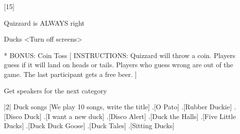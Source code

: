 \documentclass{pubQuiz}
\begin{document}
	[15] %
		\begin{PubRules}
			\item Quizzard is ALWAYS right
		\end{PubRules}
		\begin{PubCategory}{Ducks}	%
			<Turn off screens>	%
		\end{PubCategory}
		\begin{PubCategory}*		%
			{BONUS: Coin Toss}		%
			[	INSTRUCTIONS: Quizzard will throw a coin. 
				Players guess if it will land on heads or tails.
				Players who guess wrong are out of the game.
				The last participant gets a free beer.	] 
		\end{PubCategory}
		\begin{PubInstructions}
			\item Get speakers for the next category
		\end{PubInstructions}
		\begin{PubCategory}|2|		%
			{Duck songs} 	%
			[We play 10 songs, write the title]	%
			\PubQ[Track 1].[O Pato] %
			\PubQ[Track 2].[Rubber Duckie]
			\PubQ[Track 3].[Disco Duck]
			\PubQ[Track 4].[I want a new duck]
			\PubQ[Track 5].[Disco Alert]
			\PubQ[Track 6].[Duck the Halls]
			\PubQ[Track 7].[Five Little Ducks]
			\PubQ[Track 8].[Duck Duck Goose]
			\PubQ[Track 9].[Duck Tales]
			\PubQ[Track 10].[Sitting Ducks]
		\end{PubCategory}
\end{document}
